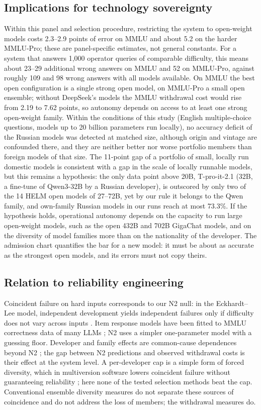 \documentclass[preprint,12pt,authoryear]{elsarticle}
\begin{document}
\subsection{Implications for technology sovereignty}
Within this panel and selection procedure, restricting the system to open-weight models costs 2.3--2.9 points of error on MMLU and about 5.2 on the harder MMLU-Pro; these are panel-specific estimates, not general constants. For a system that answers 1,000 operator queries of comparable difficulty, this means about 23--29 additional wrong answers on MMLU and 52 on MMLU-Pro, against roughly 109 and 98 wrong answers with all models available. On MMLU the best open configuration is a single strong open model, on MMLU-Pro a small open ensemble; without DeepSeek's models the MMLU withdrawal cost would rise from 2.19 to 7.62 points, so autonomy depends on access to at least one strong open-weight family. Within the conditions of this study (English multiple-choice questions, models up to 20 billion parameters run locally), no accuracy deficit of the Russian models was detected at matched size, although origin and vintage are confounded there, and they are neither better nor worse portfolio members than foreign models of that size. The 11-point gap of a portfolio of small, locally run domestic models is consistent with a gap in the scale of locally runnable models, but this remains a hypothesis: the only data point above 20B, T-pro-it-2.1 (32B, a fine-tune of Qwen3-32B by a Russian developer), is outscored by only two of the 14 HELM open models of 27--72B, yet by our rule it belongs to the Qwen family, and own-family Russian models in our runs reach at most 73.3\%. If the hypothesis holds, operational autonomy depends on the capacity to run large open-weight models, such as the open 432B and 702B GigaChat models, and on the diversity of model families more than on the nationality of the developer. The admission chart quantifies the bar for a new model: it must be about as accurate as the strongest open models, and its errors must not copy theirs.

\subsection{Relation to reliability engineering}
Coincident failure on hard inputs \citep{eckhardt1985,knight1986} corresponds to our N2 null: in the Eckhardt--Lee model, independent development yields independent failures only if difficulty does not vary across inputs \citep{littlewood2001review}. Item response models have been fitted to MMLU correctness data of many LLMs \citep{maiapolo2024tiny}; N2 uses a simpler one-parameter model with a guessing floor. Developer and family effects are common-cause dependences beyond N2 \citep{iaea1992ccf}; the gap between N2 predictions and observed withdrawal costs is their effect at the system level. A per-developer cap is a simple form of forced diversity, which in multiversion software lowers coincident failure without guaranteeing reliability \citep{littlewood1989}; here none of the tested selection methods beat the cap. Conventional ensemble diversity measures \citep{kuncheva2003} do not separate these sources of coincidence and do not address the loss of members; the withdrawal measures do.
\end{document}
